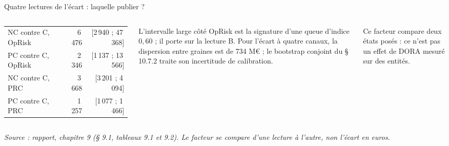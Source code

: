 \documentclass[aspectratio=169,10pt,t]{beamer}
\newcommand{\source}[1]{\par\vfill{\tiny\color{gris}\textit{Source : #1}}\par\vspace{-1mm}}
\begin{document}
\begin{frame}{Quatre lectures de l'écart : laquelle publier ?}
\begin{columns}[T,onlytextwidth]
\begin{tabular}{@{}lrr@{}}
      \midrule
      NC contre C, OpRisk & 6\,476 & [2\,940 ; 47\,368] \\
      PC contre C, OpRisk & 2\,346 & [1\,137 ; 13\,566] \\
      NC contre C, PRC & 3\,668 & [3\,201 ; 4\,094] \\
      PC contre C, PRC & 1\,257 & [1\,077 ; 1\,466] \\
      \bottomrule
    \end{tabular}\par\vspace{1mm}
    L'intervalle large côté OpRisk est la signature d'une queue d'indice $0{,}60$ ; il porte sur la lecture B. Pour l'écart à quatre canaux, la dispersion entre graines est de 734 M€ ; le bootstrap conjoint du § 10.7.2 traite son incertitude de calibration.\par\vspace{1mm}
    {\color{accent}Ce facteur compare deux états posés :} ce n'est pas un effet de DORA mesuré sur des entités.
  \end{columns}
  \source{rapport, chapitre 9 (§ 9.1, tableaux 9.1 et 9.2). Le facteur se compare d'une lecture à l'autre, non l'écart en euros.}
\end{frame}
\end{document}
